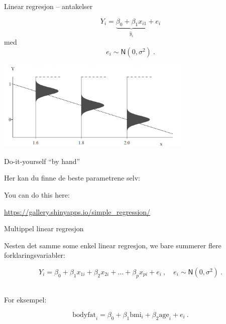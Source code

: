 \documentclass[10pt,ignorenonframetext,]{beamer}
\begin{document}
\begin{frame}{Linear regresjon -- antakelser}
\protect\hypertarget{linear-regresjon-antakelser}{}

\[Y_i = \underbrace{\beta_0 + \beta_1 x_{i1}}_{\hat{y}_i} + e_i\] med
\[e_i \sim \textsf{N}(0,\sigma^2) \ .\]

\centering

\includegraphics[width=0.7\textwidth,height=\textheight]{regrAssumptions.jpg}

\end{frame}

\begin{frame}

\begin{block}{Do-it-yourself ``by hand''}

\vspace{6mm}

Her kan du finne de beste parametrene selv: \vspace{2mm}

You can do this here: \vspace{2mm}

\url{https://gallery.shinyapps.io/simple_regression/}

\end{block}

\end{frame}

\begin{frame}{Multippel linear regresjon}
\protect\hypertarget{multippel-linear-regresjon}{}

Nesten det samme some enkel linear regresjon, we bare summerer flere
forklaringsvariabler:

\[Y_i = \beta_0 + \beta_1 x_{1i} + \beta_2 x_{2i} + \ldots + \beta_p x_{pi} + e_i \ , \quad e_i \sim\mathsf{N}(0,\sigma^2) \ .\]
\(~\)

For eksempel:

\[\text{bodyfat}_i = \beta_0 + \beta_1 \text{bmi}_i + \beta_2 \text{age}_i + e_i \ .\]

\end{frame}
\end{document}
